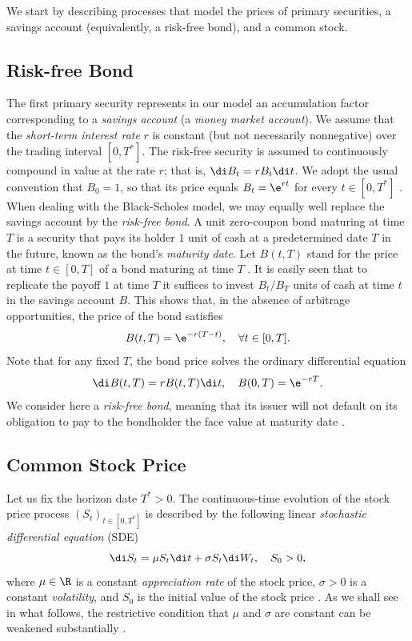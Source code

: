 We start by describing processes that model the prices of primary securities, a savings account (equivalently, a risk-free bond), and a common stock.

\subsection{Risk-free Bond}
The first primary security represents in our model an accumulation factor corresponding to a \emph{savings account} (a \emph{money market account}). We assume that the \emph{short-term interest rate} $r$ is constant (but not necessarily nonnegative) over the trading interval $[0, T^*]$. The risk-free security is assumed to continuously compound in value at the rate $r$; that is, $\di B_t = r B_t \di t$. We adopt the usual convention that $B_0 = 1$, so that its price equals $B_t = \e^{rt}$ for every $t \in [0, T^*]$ \citep{merton_theory_1973}. When dealing with the Black-Scholes model, we may equally well replace the savings account by the \emph{risk-free bond}. A unit zero-coupon bond maturing at time $T$ is a security that pays its holder $1$ unit of cash at a predetermined date $T$ in the future, known as the bond's \emph{maturity date}. Let $B(t, T)$ stand for the price at time $t \in [0, T]$ of a bond maturing at time $T$ \citep{brennan_continuous_1979}. It is easily seen that to replicate the payoff $1$ at time $T$ it suffices to invest $B_t/B_T$ units of cash at time $t$ in the savings account $B$. This shows that, in the absence of arbitrage opportunities, the price of the bond satisfies
\begin{equation} \label{eq:BondPriceNoArbitrage}
	B(t, T) = \e^{-r(T-t)}, \quad \forall t \in [0, T].
\end{equation}
Note that for any fixed $T$, the bond price solves the ordinary differential equation
\begin{equation} \label{eq:BondODE}
	\di B(t, T) = r B(t, T) \di t, \quad B(0, T) = \e^{-rT}.
\end{equation}
We consider here a \emph{risk-free bond}, meaning that its issuer will not default on its obligation to pay to the bondholder the face value at maturity date \citep{bielecki_hedging_2004}.

\subsection{Common Stock Price}
Let us fix the horizon date $T^* > 0$. The continuous-time evolution of the stock price process $(S_t)_{t\in[0,T^*]}$ is described by the following linear \emph{stochastic differential equation} (SDE)
\begin{equation} \label{eq:LinearSDE}
	\di S_t = \mu S_t \di t + \sigma S_t \di W_t, \quad S_0 > 0,
\end{equation}
where $\mu \in \R$ is a constant \emph{appreciation rate} of the stock price, $\sigma > 0$ is a constant \emph{volatility}, and $S_0$ is the initial value of the stock price \citep{black_pricing_1973}. As we shall see in what follows, the restrictive condition that $\mu$ and $\sigma$ are constant can be weakened substantially \citep{heston_closed-form_1993, bensoussan_stochastic_1994}.

